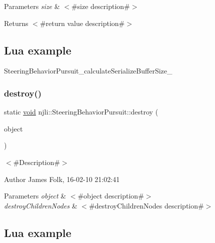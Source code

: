 \begin{DoxyParams}{Parameters}
{\em size} & $<$\#size description\#$>$\\
\hline
\end{DoxyParams}
\begin{DoxyReturn}{Returns}
$<$\#return value description\#$>$
\end{DoxyReturn}
\hypertarget{classnjli_1_1_steering_behavior_wander_ex1}{}\subsection{Lua example}\label{classnjli_1_1_steering_behavior_wander_ex1}

\begin{DoxyCodeInclude}
\end{DoxyCodeInclude}
Steering\+Behavior\+Pursuit\+\_\+calculate\+Serialize\+Buffer\+Size\+\_\+ \mbox{\label{classnjli_1_1_steering_behavior_pursuit_a4c966886f73de91d80ec621875c27ad0}} 
\subsubsection{\texorpdfstring{destroy()}{destroy()}}
{\footnotesize\ttfamily static \mbox{\hyperlink{_thread_8h_af1e856da2e658414cb2456cb6f7ebc66}{void}} njli\+::\+Steering\+Behavior\+Pursuit\+::destroy (\begin{DoxyParamCaption}\item[{\mbox{\hyperlink{classnjli_1_1_steering_behavior_pursuit}{Steering\+Behavior\+Pursuit}} $\ast$}]{object }\end{DoxyParamCaption})\hspace{0.3cm}{\ttfamily [static]}}



$<$\#\+Description\#$>$ 

\begin{DoxyAuthor}{Author}
James Folk, 16-\/02-\/10 21\+:02\+:41
\end{DoxyAuthor}

\begin{DoxyParams}{Parameters}
{\em object} & $<$\#object description\#$>$ \\
\hline
{\em destroy\+Children\+Nodes} & $<$\#destroy\+Children\+Nodes description\#$>$\\
\hline
\end{DoxyParams}
\hypertarget{classnjli_1_1_steering_behavior_wander_ex1}{}\subsection{Lua example}\label{classnjli_1_1_steering_behavior_wander_ex1}

